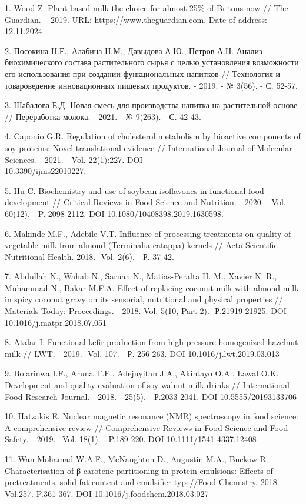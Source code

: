 \begin{references}
1. Wood Z. Plant-based milk the choice for almost 25\% of Britons now //
The Guardian. -- 2019. URL:
\href{https://www.theguardian.com/food/2019/jul/19/plant-based-milk-the-choice-for-almost-25-of-britons-now}{https://www.theguardian.com}.
Date of address: 12.11.2024

2. Посокина Н.Е., Алабина Н.М., Давыдова А.Ю., Петров А.Н. Анализ
биохимического состава растительного сырья с целью установления
возможности его использования при создании функциональных напитков //
Технология и товароведение инновационных пищевых продуктов. - 2019. - №
3(56). - С. 52-57.

3. Шабалова Е.Д. Новая смесь для производства напитка на растительной
основе // Переработка молока. - 2021. - № 9(263). - С. 42-43.

4. Caponio G.R. Regulation of cholesterol metabolism by bioactive
components of soy proteins: Novel translational evidence //
International Journal of Molecular Sciences. - 2021. - Vol. 22(1):227.
DOI \\10.3390/ijms22010227.

5. Hu C. Biochemistry and use of soybean isoflavones in functional food
development // Critical Reviews in Food Science and Nutrition. - 2020. -
Vol. 60(12). - P. 2098-2112.
\href{https://doi.org/10.1080/10408398.2019.1630598}{DOI
10.1080/10408398.2019.1630598}.

6. Makinde M.F., Adebile V.T. Influence of processing treatments on
quality of vegetable milk from almond (Terminalia catappa) kernels //
Acta Scientific Nutritional Health.-2018. -Vol. 2(6). - Р. 37-42.

7. Abdullah N., Wahab N., Saruan N., Matias-Peralta H. M., Xavier N. R.,
Muhammad N., Bakar M.F.A. Effect of replacing coconut milk with almond
milk in spicy coconut gravy on its sensorial, nutritional and physical
properties // Materials Today: Proceedings. - 2018.-Vol. 5(10, Part 2).
-Р.21919-21925. DOI 10.1016/j.matpr.2018.07.051

8. Atalar I. Functional kefir production from high pressure homogenized
hazelnut milk // LWT. - 2019. -Vol. 107. - Р. 256-263. DOI
10.1016/j.lwt.2019.03.013

9. Bolarinwa I.F., Aruna T.E., Adejuyitan J.A., Akintayo O.A., Lawal
O.K. Development and quality evaluation of soy-walnut milk drinks //
International Food Research Journal. - 2018. - 25(5). - Р.2033-2041. DOI
10.5555/20193133706

10. Hatzakis E. Nuclear magnetic resonance (NMR) spectroscopy in food
science: A comprehensive review // Comprehensive Reviews in Food Science
and Food Safety. - 2019. --Vol. 18(1). - P.189-220. DOI
10.1111/1541-4337.12408

11. Wan Mohamad W.A.F., McNaughton D., Augustin M.A., Buckow R.
Characterisation of β-carotene partitioning in protein emulsions:
Effects of pretreatments, solid fat content and emulsifier type//Food
Chemistry.-2018.-Vol.257.-P.361-367. DOI 10.1016/j.foodchem.2018.03.027
\end{references}

